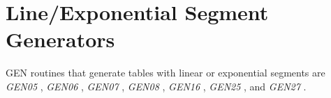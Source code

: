 \begin{comment}
\documentclass[10pt]{article}
\usepackage{fullpage, graphicx, url}
\setlength{\parskip}{1ex}
\setlength{\parindent}{0ex}
\title{Line/Exponential Segment Generators}



\begin{tabular}{ccc}
The Alternative Csound Reference Manual & & \\
Previous &The Standard Numeric Score &Next

\end{tabular}

\end{comment}
\section{Line/Exponential Segment Generators}


  GEN routines that generate tables with linear or exponential segments are \emph{GEN05}
, \emph{GEN06}
, \emph{GEN07}
, \emph{GEN08}
, \emph{GEN16}
, \emph{GEN25}
, and \emph{GEN27}
. 


\begin{comment}
\begin{tabular}{lcr}
Previous &Home &Next \\
Sine/Cosine Generators &Up &File Access GEN Routines

\end{tabular}



\end{comment}

